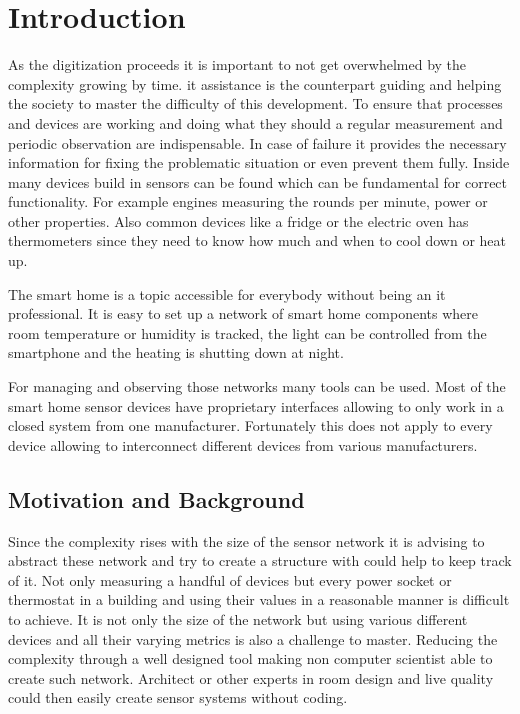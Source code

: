 \chapter{Introduction}
As the digitization proceeds it is important to not get overwhelmed by the complexity growing by time. \gls{it} assistance is the counterpart guiding and helping the society to master the difficulty of this development. To ensure that processes and devices are working and doing what they should a regular measurement and periodic observation are indispensable. In case of failure it provides the necessary information for fixing the problematic situation or even prevent them fully. Inside many devices build in sensors can be found which can be fundamental for correct functionality. For example engines measuring the rounds per minute, power or other properties. Also common devices like a fridge or the electric oven has thermometers since they need to know how much and when to cool down or heat up. 

The smart home is a topic accessible for everybody without being an \gls{it} professional. It is easy to set up a network of smart home components where room temperature or humidity is tracked, the light can be controlled from the smartphone and the heating is shutting down at night. 

For managing and observing those networks many tools can be used. Most of the smart home sensor devices have proprietary interfaces allowing to only work in a closed system from one manufacturer. Fortunately this does not apply to every device allowing to interconnect different devices from various manufacturers. 

\section{Motivation and Background}
Since the complexity rises with the size of the sensor network it is advising to abstract these network and try to create a structure with could help to keep track of it. Not only measuring a handful of devices but every power socket or thermostat in a building and using their values in a reasonable manner is difficult to achieve. It is not only the size of the network but using various different devices and all their varying metrics is also a challenge to master. Reducing the complexity through a well designed tool making non computer scientist able to create such network. Architect or other experts in room design and live quality could then easily create sensor systems without coding.

